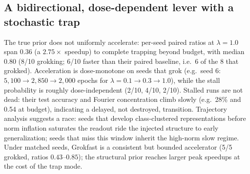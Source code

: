 \documentclass[11pt]{article}
\begin{document}
\subsection{A bidirectional, dose-dependent lever with a stochastic trap}
The true prior does not uniformly accelerate: per-seed paired ratios at $\lambda{=}1.0$ span
$0.36$ (a $2.75\times$ speedup) to complete trapping beyond budget, with median $0.80$ (8/10
grokking; 6/10 faster than their paired baseline, i.e.\ 6 of the 8 that grokked). Acceleration is dose-monotone on seeds that
grok (e.g.\ seed 6: $5{,}100 \to 2{,}850 \to 2{,}000$ epochs for
$\lambda = 0.1 \to 0.3 \to 1.0$), while the stall probability is roughly dose-independent
(2/10, 4/10, 2/10). Stalled runs are not dead: their test accuracy and Fourier concentration
climb slowly (e.g.\ 28\% and 0.54 at budget), indicating a delayed, not destroyed, transition.
Trajectory analysis suggests a race: seeds that develop class-clustered representations before
norm inflation saturates the readout ride the injected structure to early generalization; seeds
that miss this window inherit the high-norm slow regime. Under matched seeds, Grokfast
\citep{lee2024grokfast} is a consistent but bounded accelerator (5/5 grokked, ratios
$0.43$--$0.85$); the structural prior reaches larger peak speedups at the cost of the trap mode.
\end{document}
